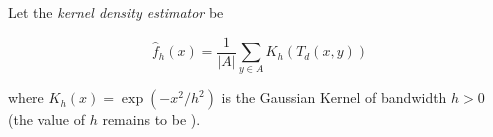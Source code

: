 Let the \textit{ kernel density estimator} be

\[   \hat{f}_h(x) = \frac{1}{|A|}\sum_{ y \in A} K_h (T_d(x,y))  \]

 where $K_h(x) = \exp( -x^2/h^2)$ is the Gaussian Kernel of bandwidth $h>0$ (the value of $h$ remains to be ).

